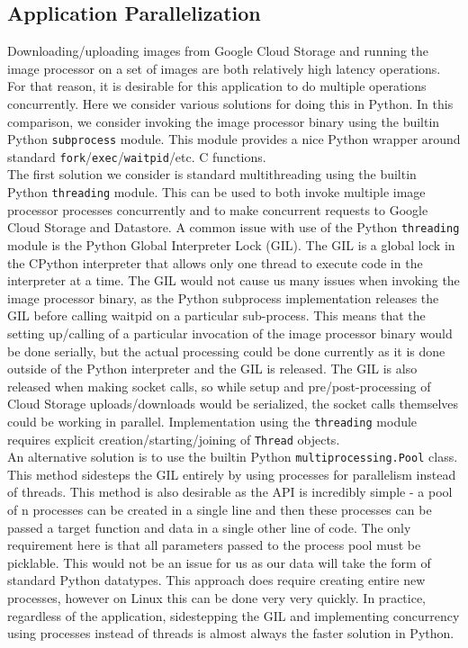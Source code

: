 \documentclass[10pt, onecolumn, draftclsnofoot, letterpaper, compsoc]{IEEEtran}
\begin{document}
\subsection{Application Parallelization}

Downloading/uploading images from Google Cloud Storage and running the 
image processor on a set of images are both relatively high latency operations. 
For that reason, it is desirable for this application to do multiple operations 
concurrently. Here we consider various solutions for doing this in Python. In 
this comparison, we consider invoking the image processor binary using the 
builtin Python {\tt subprocess} module. This module provides a nice Python wrapper 
around standard {\tt fork}/{\tt exec}/{\tt waitpid}/etc. C functions. \\

The first solution we consider is standard multithreading using the builtin 
Python {\tt threading} module. This can be used to both invoke multiple image 
processor processes concurrently and to make concurrent requests to Google 
Cloud Storage and Datastore. A common issue with use of the Python {\tt threading} 
module is the Python Global Interpreter Lock (GIL)\cite{gilArticle}. The GIL 
is a global lock in the CPython interpreter that allows only one thread to 
execute code in the interpreter at a time\cite{gilArticle}. The GIL would 
not cause us many issues when invoking the image processor binary, as 
the Python subprocess implementation releases the GIL before calling 
waitpid on a particular sub-process. This means that the 
setting up/calling of a particular invocation of the image processor binary 
would be done serially, but the actual processing could be done currently as 
it is done outside of the Python interpreter and the GIL is released\cite{gilArticle}. 
The GIL is also released when making socket calls, so while setup and 
pre/post-processing of Cloud Storage uploads/downloads would be 
serialized, the socket calls themselves could be working in parallel\cite{gilArticle}. 
Implementation using the {\tt threading} module requires explicit 
creation/starting/joining of {\tt Thread} objects. \\

An alternative solution is to use the builtin Python {\tt multiprocessing.Pool}
class. This method sidesteps the GIL entirely by using processes for 
parallelism instead of threads\cite{multiproc}. This method is also desirable 
as the API is incredibly simple - a pool of n processes can be created in a 
single line and then these processes can be passed a target function and 
data in a single other line of code\cite{multiproc}. The only requirement 
here is that all parameters passed to the process pool must be picklable\cite{multiproc}. 
This would not be an issue for us as our data will take the form of standard 
Python datatypes. This approach does require creating entire new processes, 
however on Linux this can be done very very quickly. In practice, regardless 
of the application, sidestepping the GIL and implementing concurrency using 
processes instead of threads is almost always the faster solution in Python. \\
\end{document}
